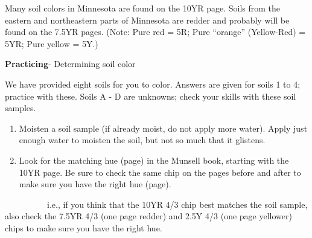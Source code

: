 \documentclass[
  letterpaper,
  twocolumn,
  portrait]{scrbook}
\begin{document}
Many soil colors in Minnesota are found on the 10YR page. Soils from the
eastern and northeastern parts of Minnesota are redder and probably will
be found on the 7.5YR pages. (Note: Pure red = 5R; Pure ``orange''
(Yellow-Red) = 5YR; Pure yellow = 5Y.)

\textbf{Practicing}- Determining soil color

We have provided eight soils for you to color. Answers are given for
soils 1 to 4; practice with these. Soils A - D are unknowns; check your
skills with these soil samples.

\begin{enumerate}
\def\labelenumi{\arabic{enumi}.}
\item
  Moisten a soil sample (if already moist, do not apply more water).
  Apply just enough water to moisten the soil, but not so much that it
  glistens.
\item
  Look for the matching hue (page) in the Munsell book, starting with
  the 10YR page. Be sure to check the same chip on the pages before and
  after to make sure you have the right hue (page).
\end{enumerate}

~~~~~~~~~~i.e., if you think that the 10YR 4/3 chip best matches the
soil sample, also check the 7.5YR 4/3 (one page redder) and 2.5Y 4/3
(one page yellower) chips to make sure you have the right hue.

 
  \providecommand{\huxb}[2]{\arrayrulecolor[RGB]{#1}\global\arrayrulewidth=#2pt}
  \providecommand{\huxvb}[2]{\color[RGB]{#1}\vrule width #2pt}
  \providecommand{\huxtpad}[1]{\rule{0pt}{#1}}
  \providecommand{\huxbpad}[1]{\rule[-#1]{0pt}{#1}}
\end{document}
